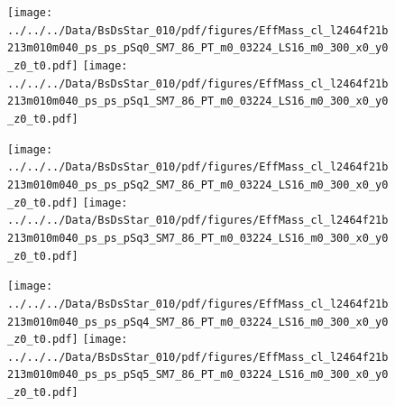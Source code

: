 \documentclass[a4paper,10pt]{article}
\begin{document}
\clearpage
\begin{figure}[p]
 \texttt{[image: ../../../Data/BsDsStar\_010/pdf/figures/EffMass\_cl\_l2464f21b213m010m040\_ps\_ps\_pSq0\_SM7\_86\_PT\_m0\_03224\_LS16\_m0\_300\_x0\_y0\_z0\_t0.pdf]} 
 \texttt{[image: ../../../Data/BsDsStar\_010/pdf/figures/EffMass\_cl\_l2464f21b213m010m040\_ps\_ps\_pSq1\_SM7\_86\_PT\_m0\_03224\_LS16\_m0\_300\_x0\_y0\_z0\_t0.pdf]} 
 \end{figure}
\begin{figure}[p]
 \texttt{[image: ../../../Data/BsDsStar\_010/pdf/figures/EffMass\_cl\_l2464f21b213m010m040\_ps\_ps\_pSq2\_SM7\_86\_PT\_m0\_03224\_LS16\_m0\_300\_x0\_y0\_z0\_t0.pdf]} 
 \texttt{[image: ../../../Data/BsDsStar\_010/pdf/figures/EffMass\_cl\_l2464f21b213m010m040\_ps\_ps\_pSq3\_SM7\_86\_PT\_m0\_03224\_LS16\_m0\_300\_x0\_y0\_z0\_t0.pdf]} 
 \end{figure}
\begin{figure}[p]
 \texttt{[image: ../../../Data/BsDsStar\_010/pdf/figures/EffMass\_cl\_l2464f21b213m010m040\_ps\_ps\_pSq4\_SM7\_86\_PT\_m0\_03224\_LS16\_m0\_300\_x0\_y0\_z0\_t0.pdf]} 
 \texttt{[image: ../../../Data/BsDsStar\_010/pdf/figures/EffMass\_cl\_l2464f21b213m010m040\_ps\_ps\_pSq5\_SM7\_86\_PT\_m0\_03224\_LS16\_m0\_300\_x0\_y0\_z0\_t0.pdf]} 
 \end{figure}
\clearpage
\clearpage
\end{document}
